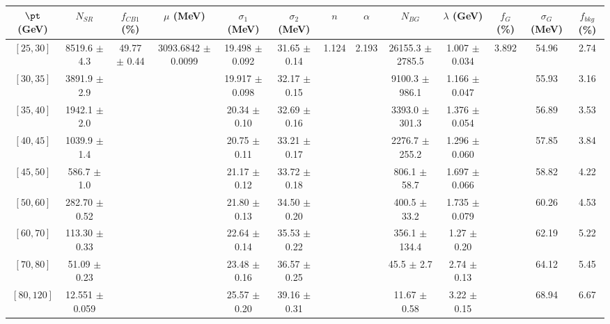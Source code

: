\begin{tabular}{c||c|c|c|c|c|c|c|c|c|c|c||c}
$\pt$ (GeV) & $N_{SR}$ & $f_{CB1}$ (\%) & $\mu$ (MeV) & $\sigma_1$ (MeV) & $\sigma_2$ (MeV) & $n$ & $\alpha$ & $N_{BG}$ & $\lambda$ (GeV) & $f_G$ (\%) & $\sigma_G$ (MeV) & $f_{bkg}$ (\%) \\
\hline
$[25, 30]$ & 8519.6 $\pm$ 4.3 & \multirow{9}{*}{49.77 $\pm$ 0.44} & \multirow{9}{*}{3093.6842 $\pm$ 0.0099} & 19.498 $\pm$ 0.092 & 31.65 $\pm$ 0.14 & \multirow{9}{*}{1.124} & \multirow{9}{*}{2.193} & 26155.3 $\pm$ 2785.5 & 1.007 $\pm$ 0.034 & \multirow{9}{*}{3.892} & 54.96 & 2.74\\
$[30, 35]$ & 3891.9 $\pm$ 2.9 &  &  & 19.917 $\pm$ 0.098 & 32.17 $\pm$ 0.15 &  &  & 9100.3 $\pm$ 986.1 & 1.166 $\pm$ 0.047 &  & 55.93 & 3.16\\
$[35, 40]$ & 1942.1 $\pm$ 2.0 &  &  & 20.34 $\pm$ 0.10 & 32.69 $\pm$ 0.16 &  &  & 3393.0 $\pm$ 301.3 & 1.376 $\pm$ 0.054 &  & 56.89 & 3.53\\
$[40, 45]$ & 1039.9 $\pm$ 1.4 &  &  & 20.75 $\pm$ 0.11 & 33.21 $\pm$ 0.17 &  &  & 2276.7 $\pm$ 255.2 & 1.296 $\pm$ 0.060 &  & 57.85 & 3.84\\
$[45, 50]$ & 586.7 $\pm$ 1.0 &  &  & 21.17 $\pm$ 0.12 & 33.72 $\pm$ 0.18 &  &  & 806.1 $\pm$ 58.7 & 1.697 $\pm$ 0.066 &  & 58.82 & 4.22\\
$[50, 60]$ & 282.70 $\pm$ 0.52 &  &  & 21.80 $\pm$ 0.13 & 34.50 $\pm$ 0.20 &  &  & 400.5 $\pm$ 33.2 & 1.735 $\pm$ 0.079 &  & 60.26 & 4.53\\
$[60, 70]$ & 113.30 $\pm$ 0.33 &  &  & 22.64 $\pm$ 0.14 & 35.53 $\pm$ 0.22 &  &  & 356.1 $\pm$ 134.4 & 1.27 $\pm$ 0.20 &  & 62.19 & 5.22\\
$[70, 80]$ & 51.09 $\pm$ 0.23 &  &  & 23.48 $\pm$ 0.16 & 36.57 $\pm$ 0.25 &  &  & 45.5 $\pm$ 2.7 & 2.74 $\pm$ 0.13 &  & 64.12 & 5.45\\
$[80, 120]$ & 12.551 $\pm$ 0.059 &  &  & 25.57 $\pm$ 0.20 & 39.16 $\pm$ 0.31 &  &  & 11.67 $\pm$ 0.58 & 3.22 $\pm$ 0.15 &  & 68.94 & 6.67\\
\end{tabular}
